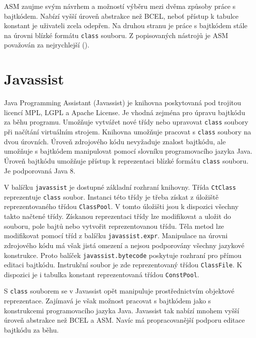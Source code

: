 ASM zaujme svým návrhem a možností výběru mezi dvěma způsoby práce s bajtkódem. Nabízí vyšší úroveň abstrakce než BCEL, neboť přístup k tabulce konstant je uživateli zcela odepřen. Na druhou stranu je práce s bajtkódem stále na úrovni blízké formátu \texttt{class} souboru. Z popisovaných nástrojů je ASM považován za nejrychlejší ().


\section{Javassist}\label{ToolsJavassist}

Java Programming Assistant (Javassist) je knihovna poskytovaná pod trojitou licencí MPL, LGPL a Apache License. Je vhodná zejména pro úpravu bajtkódu za běhu programu. Umožňuje vytvářet nové třídy nebo upravovat \texttt{class} soubory při načítání virtuálním strojem. Knihovna umožňuje pracovat s \texttt{class} soubory na dvou úrovních. Úroveň zdrojového kódu nevyžaduje znalost bajtkódu, ale umožňuje s bajtkódem manipulovat pomocí slovníku programovacího jazyka Java. Úroveň bajtkódu umožňuje přístup k reprezentaci blízké formátu \texttt{class} souboru. Je podporovaná Java 8.

V balíčku \texttt{javassist} je dostupné základní rozhraní knihovny. Třída \texttt{CtClass} reprezentuje \texttt{class} soubor. Instanci této třídy je třeba získat z úložiště reprezentovaného třídou \texttt{ClassPool}. V tomto úložišti jsou k dispozici všechny takto načtené třídy. Získanou reprezentaci třídy lze modifikovat a uložit do souboru, pole bajtů nebo vytvořit reprezentovanou třídu. Těla metod lze modifikovat pomocí tříd z balíčku \texttt{javassist.expr}. Manipulace na úrovni zdrojového kódu má však jistá omezení a nejsou podporovány všechny jazykové konstrukce. Proto balíček \texttt{javassist.bytecode} poskytuje rozhraní pro přímou editaci bajtkódu. Instrukční soubor je zde reprezentovaný třídou \texttt{ClassFile}. K dispozici je i tabulka konstant reprezentovaná třídou \texttt{ConstPool}.

S \texttt{class} souborem se v Javassist opět manipuluje prostřednictvím objektové reprezentace. Zajímavá je však možnost pracovat s bajtkódem jako s konstrukcemi programovacího jazyka Java. Javassist tak nabízí mnohem vyšší úroveň abstrakce než BCEL a ASM. Navíc má propracovanější podporu editace bajtkódu za běhu.

